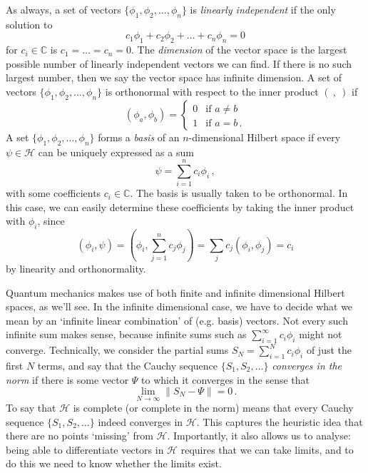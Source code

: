 \documentclass{article}
\theoremstyle{plain}\theoremheaderfont{\normalfont\itshape}\theorembodyfont{\rmfamily}\theoremseparator{.}\newtheorem*{rem}{Remark}\newtheorem*{ex}{Example}\newtheorem*{proof}{Proof}\newtheorem*{altp}{Alternative proof}
\theoremstyle{plain}\theoremheaderfont{\normalfont\bfseries}\theorembodyfont{\rmfamily}\theoremseparator{.}\newtheorem{thm}{Theorem}[section]\newtheorem{lem}[thm]{Lemma}\newtheorem{prop}[thm]{Proposition}\newtheorem*{cor}{Corollary}\newtheorem{defn}[thm]{Definition}\newtheorem{clm}[thm]{Claim}\newtheorem{clminproof}{Claim}
\theoremstyle{break}\theoremheaderfont{\normalfont\itshape}\theorembodyfont{\rmfamily}\theoremseparator{.\medskip}\newtheorem*{proofskip}{Proof}\newtheorem*{exs}{Examples}\newtheorem*{rems}{Remarks}
\theoremstyle{break}\theoremheaderfont{\normalfont\bfseries}\theorembodyfont{\rmfamily}\theoremseparator{.\medskip}\newtheorem{lemskip}[thm]{Lemma}\newtheorem{defnskip}[thm]{Definition}\newtheorem{propskip}[thm]{Proposition}\newtheorem{thmskip}[thm]{Theorem}
\numberwithin{equation}{section}
\newcommand{\vb}[1]{\bm{\mathrm{#1}}}
\newcommand{\norm}[1]{\left\| #1 \right\|}
\newcommand{\hb}{\mathcal{H}}
\newcommand{\CC}{\mathbb{C}}
\begin{document}
    As always, a set of vectors \(\{\phi_1,\phi_2,\dots,\phi_n\}\) is \textit{linearly independent} if the only solution to
    \begin{equation}
        c_1\phi_1+c_2\phi_2+\dots +c_n\phi_n=\vb{0}
    \end{equation}
    for \(c_i\in\CC\) is \(c_1=\dots=c_n=0\). The \textit{dimension} of the vector space is the largest possible number of linearly independent vectors we can find. If there is no such largest number, then we say the vector space has infinite dimension. A set of vectors \(\{\phi_1,\phi_2,\dots,\phi_n\}\) is orthonormal with respect to the inner product \((\ ,\ )\) if
    \begin{equation}
        (\phi_a,\phi_b)=\begin{cases}
        0 & \text{if }a\ne b\\
        1 & \text{if }a=b\,.
    \end{cases}
    \end{equation}
    A set \(\{\phi_1,\phi_2,\dots,\phi_n\}\) forms a \textit{basis} of an \(n\)-dimensional Hilbert space if every \(\psi\in\hb\) can be uniquely expressed as a sum
    \begin{equation}
        \psi=\sum_{i=1}^{n}c_i\phi_i\,,
    \end{equation}
    with some coefficients \(c_i\in\CC\). The basis is usually taken to be orthonormal. In this case, we can easily determine these coefficients by taking the inner product with \(\phi_i\), since
    \begin{equation}
        (\phi_i,\psi)=\left(\phi_i,\sum_{j=1}^{n}c_j\phi_j\right)=\sum_j c_j(\phi_i,\phi_j)=c_i
    \end{equation}
    by linearity and orthonormality.

    Quantum mechanics makes use of both finite and infinite dimensional Hilbert spaces, as we'll see. In the infinite dimensional case, we have to decide what we mean by an `infinite linear combination' of (e.g. basis) vectors. Not every such infinite sum makes sense, because infinite sums such as \(\sum_{i=1}^{\infty}c_i\phi_i\) might not converge. Technically, we consider the partial sums \(S_N=\sum_{i=1}^{N}c_i\phi_i\) of just the first \(N\) terms, and say that the Cauchy sequence \(\{S_1,S_2,\dots\}\) \textit{converges in the norm} if there is some vector \(\Psi\) to which it converges in the sense that
    \begin{equation}
        \lim_{N\to\infty}\norm{S_N-\Psi}=0\,.
    \end{equation}
    To say that \(\hb\) is complete (or complete in the norm) means that every Cauchy sequence \(\{S_1,S_2,\dots\}\) indeed converges in \(\hb\). This captures the heuristic idea that there are no points `missing' from \(\hb\). Importantly, it also allows us to analyse: being able to differentiate vectors in \(\hb\) requires that we can take limits, and to do this we need to know whether the limits exist.
\end{document}
